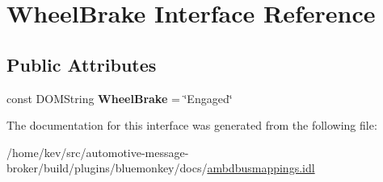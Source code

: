 \hypertarget{interfaceWheelBrake}{\section{Wheel\+Brake Interface Reference}
\label{interfaceWheelBrake}
}
\subsection*{Public Attributes}
\begin{DoxyCompactItemize}
\item 
\hypertarget{interfaceWheelBrake_aefe3f165494d64a9d241d239765c117b}{const D\+O\+M\+String {\bfseries Wheel\+Brake} = \char`\"{}Engaged\char`\"{}}\label{interfaceWheelBrake_aefe3f165494d64a9d241d239765c117b}

\end{DoxyCompactItemize}


The documentation for this interface was generated from the following file\+:\begin{DoxyCompactItemize}
\item 
/home/kev/src/automotive-\/message-\/broker/build/plugins/bluemonkey/docs/\hyperlink{ambdbusmappings_8idl}{ambdbusmappings.\+idl}\end{DoxyCompactItemize}

